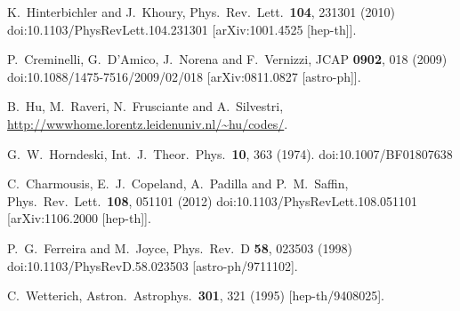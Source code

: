 \documentclass[useAMS,12pt]{article}
\begin{document}
\begin{thebibliography}{}
  K.~Hinterbichler and J.~Khoury,
  Phys.\ Rev.\ Lett.\  {\bf 104}, 231301 (2010)
  doi:10.1103/PhysRevLett.104.231301
  [arXiv:1001.4525 [hep-th]].


  P.~Creminelli, G.~D'Amico, J.~Norena and F.~Vernizzi,
  JCAP {\bf 0902}, 018 (2009)
  doi:10.1088/1475-7516/2009/02/018
  [arXiv:0811.0827 [astro-ph]].


  B.~Hu, M.~Raveri, N.~Frusciante and A.~Silvestri,
  \url{http://wwwhome.lorentz.leidenuniv.nl/~hu/codes/}.
  
  G.~W.~Horndeski,
  Int.\ J.\ Theor.\ Phys.\  {\bf 10}, 363 (1974).
  doi:10.1007/BF01807638

  C.~Charmousis, E.~J.~Copeland, A.~Padilla and P.~M.~Saffin,
  Phys.\ Rev.\ Lett.\  {\bf 108}, 051101 (2012)
  doi:10.1103/PhysRevLett.108.051101
  [arXiv:1106.2000 [hep-th]].


  P.~G.~Ferreira and M.~Joyce,
  Phys.\ Rev.\ D {\bf 58}, 023503 (1998)
  doi:10.1103/PhysRevD.58.023503
  [astro-ph/9711102].


  C.~Wetterich,
  Astron.\ Astrophys.\  {\bf 301}, 321 (1995)
  [hep-th/9408025].



\end{thebibliography}
\end{document}
